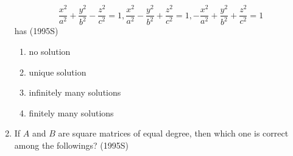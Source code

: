 \begin{enumerate}
		$$
		\frac{x^2}{a^2} + \frac{y^2}{b^2} - \frac{z^2}{c^2} = 1	,
		\frac{x^2}{a^2} - \frac{y^2}{b^2} + \frac{z^2}{c^2} = 1	,
		-\frac{x^2}{a^2} + \frac{y^2}{b^2} + \frac{z^2}{c^2} = 1
		$$ has	
		\hfill (1995S)

		\begin{multicols}{2}
			\begin{enumerate}
				\item no solution
				\item unique solution
				\columnbreak
				\item infinitely many solutions
				\item finitely many solutions
			\end{enumerate}
		\end{multicols}

	\item If $A$ and $B$ are square matrices of equal degree, then which
		one is correct among the followings?
		\hfill (1995S)


\end{enumerate}
